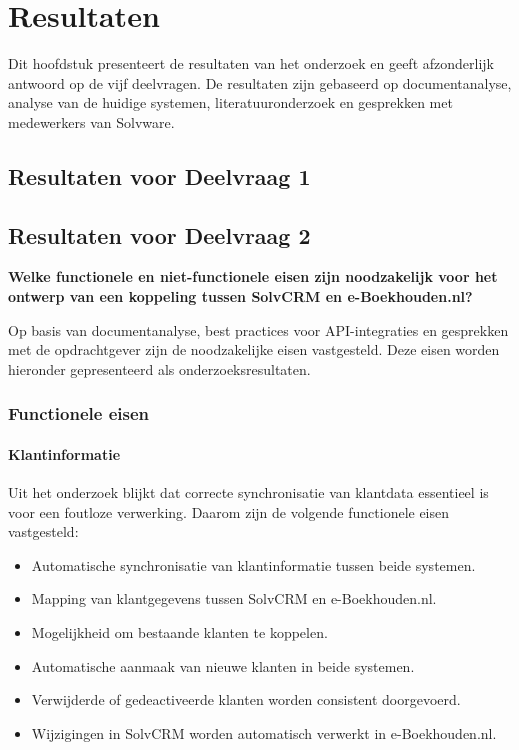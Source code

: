 \chapter{Resultaten}
Dit hoofdstuk presenteert de resultaten van het onderzoek en geeft afzonderlijk antwoord op de vijf deelvragen.
De resultaten zijn gebaseerd op documentanalyse, analyse van de huidige systemen, literatuuronderzoek en gesprekken met medewerkers van Solvware.

\section{Resultaten voor Deelvraag 1}

\section{Resultaten voor Deelvraag 2}
\textbf{Welke functionele en niet-functionele eisen zijn noodzakelijk voor het ontwerp van een koppeling tussen SolvCRM en e-Boekhouden.nl?}

Op basis van documentanalyse, best practices voor API-integraties en gesprekken met de opdrachtgever zijn de noodzakelijke eisen vastgesteld. Deze eisen worden hieronder gepresenteerd als onderzoeksresultaten.

\subsection{Functionele eisen}

\subsubsection*{Klantinformatie}
Uit het onderzoek blijkt dat correcte synchronisatie van klantdata essentieel is voor een foutloze verwerking. Daarom zijn de volgende functionele eisen vastgesteld:

\begin{itemize}
    \item Automatische synchronisatie van klantinformatie tussen beide systemen.
    \item Mapping van klantgegevens tussen SolvCRM en e-Boekhouden.nl.
    \item Mogelijkheid om bestaande klanten te koppelen.
    \item Automatische aanmaak van nieuwe klanten in beide systemen.
    \item Verwijderde of gedeactiveerde klanten worden consistent doorgevoerd.
    \item Wijzigingen in SolvCRM worden automatisch verwerkt in e-Boekhouden.nl.
\end{itemize}

